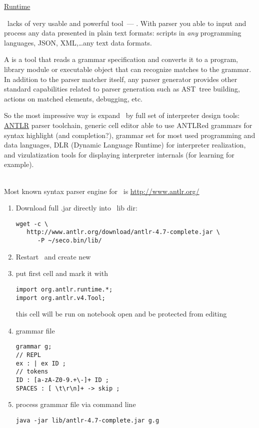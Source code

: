 
\href{https://www.youtube.com/watch?v=2AM85plUtDU}{Runtime}\bigskip

\noindent
\seco\ lacks of very usable and powerful tool\ --- . With
parser you able to input and process any data presented in plain text formats:
scripts in \emph{any} programming languages, JSON, XML,\ldots any text
data formats.

A  is a tool that reads a grammar specification and
converts it to a program, library module or executable object that can recognize
matches to the grammar. In addition to the parser matcher itself, any parser
generator provides other standard capabilities related to parser generation
such as AST\ tree building, actions on
matched elements, debugging, etc.

So the most impressive way is expand \seco\ by full set of interpreter design
tools: \href{http://www.antlr.org/}{ANTLR} parser toolchain, generic cell editor
able to use ANTLRed grammars for syntax highlight (and completion?), grammar set
for most used programming and data languages, DLR (Dynamic Language Runtime) for
interpreter realization, and vizulatization tools for displaying interpreter
internals (for learning for example).

\ \\

Most known syntax parser engine for \java\ is \url{http://www.antlr.org/}

\begin{enumerate}
  \item 
Download full .jar directly into \seco\ lib dir:
\begin{verbatim}
wget -c \
   http://www.antlr.org/download/antlr-4.7-complete.jar \
      -P ~/seco.bin/lib/
\end{verbatim}
\item Restart \seco\ and create new 
\item put first cell and mark it with 
\menu{\rms>Cell>Readonly}
\begin{verbatim}
import org.antlr.runtime.*;
import org.antlr.v4.Tool;
\end{verbatim}
this cell will be run on notebook open and be protected from editing
\item grammar file 
\begin{verbatim}
grammar g;
// REPL
ex : | ex ID ;
// tokens
ID : [a-zA-Z0-9.+\-]+ ID ;
SPACES : [ \t\r\n]+ -> skip ;
\end{verbatim}
\item process grammar file via command line
\begin{verbatim}
java -jar lib/antlr-4.7-complete.jar g.g
\end{verbatim} 
\end{enumerate}

\secup
